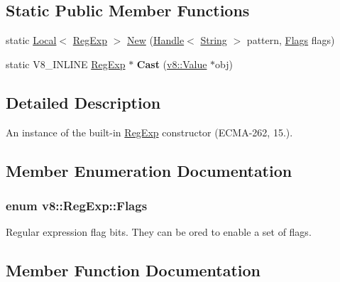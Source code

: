 \subsection*{Static Public Member Functions}
\begin{DoxyCompactItemize}
\item 
static \hyperlink{classv8_1_1_local}{Local}$<$ \hyperlink{classv8_1_1_reg_exp}{Reg\+Exp} $>$ \hyperlink{classv8_1_1_reg_exp_ac92fcff5a40cf8c698aefd021c823c2e}{New} (\hyperlink{classv8_1_1_handle}{Handle}$<$ \hyperlink{classv8_1_1_string}{String} $>$ pattern, \hyperlink{classv8_1_1_reg_exp_aa4718a5c1f18472aff3bf51ed694fc5a}{Flags} flags)
\item 
\hypertarget{classv8_1_1_reg_exp_ac06d8f61c0ebb2e7292e6aeff7108f26}{}static V8\+\_\+\+I\+N\+L\+I\+N\+E \hyperlink{classv8_1_1_reg_exp}{Reg\+Exp} $\ast$ {\bfseries Cast} (\hyperlink{classv8_1_1_value}{v8\+::\+Value} $\ast$obj)\label{classv8_1_1_reg_exp_ac06d8f61c0ebb2e7292e6aeff7108f26}

\end{DoxyCompactItemize}


\subsection{Detailed Description}
An instance of the built-\/in \hyperlink{classv8_1_1_reg_exp}{Reg\+Exp} constructor (E\+C\+M\+A-\/262, 15.). 

\subsection{Member Enumeration Documentation}
\hypertarget{classv8_1_1_reg_exp_aa4718a5c1f18472aff3bf51ed694fc5a}{}
\subsubsection[{Flags}]{\setlength{\rightskip}{0pt plus 5cm}enum {\bf v8\+::\+Reg\+Exp\+::\+Flags}}\label{classv8_1_1_reg_exp_aa4718a5c1f18472aff3bf51ed694fc5a}
Regular expression flag bits. They can be or\textquotesingle{}ed to enable a set of flags. 

\subsection{Member Function Documentation}
\hypertarget{classv8_1_1_reg_exp_ad5a5e77e6e626b3c7c69eef7ba2908cc}{}
